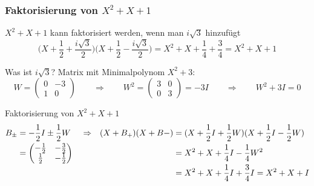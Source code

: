 %
%
%
\begin{frame}[t]
\setlength{\abovedisplayskip}{4pt}
\setlength{\belowdisplayskip}{4pt}
\frametitle{Faktorisierung von $X^2+X+1$}
\vspace{-3pt}
$X^2+X+1$ kann faktorisiert werden, wenn man $i\sqrt{3}$
hinzufügt
\[
\biggl(X+\frac12+\frac{i\sqrt{3}}2\biggr)
\biggl(X+\frac12-\frac{i\sqrt{3}}2\biggr)
=
X^2+X+\frac14
+
\frac34
=
X^2+X+1
\]
\vspace{-10pt}
\begin{block}{Was ist $i\sqrt{3}$?}
Matrix mit Minimalpolynom $X^2+3$:
\[
W=\begin{pmatrix}0&-3\\1&0\end{pmatrix}
\qquad\Rightarrow\qquad
W^2=\begin{pmatrix}3&0\\0&3\end{pmatrix} = -3I
\qquad\Rightarrow\qquad
W^2+3I=0
\]
\end{block}
\vspace{-10pt}
\begin{block}{Faktorisierung von $X^2+X+1$}
\vspace{-10pt}
\begin{align*}
B_\pm
&=
-\frac12I\pm\frac12W
&
&\Rightarrow
&
(X+B_+)(X+B-)
&=
(X+\frac12I+\frac12W)
(X+\frac12I-\frac12W)
\\
&=
\smash{
{\textstyle\begin{pmatrix}-\frac12&-\frac32\\\frac12&-\frac12\end{pmatrix}}
}
&
&
&
&=
X^2+X + \frac14I - \frac14W^2
\\
&
&
&%
&
&=
X^2+X + \frac14I + \frac34I
=
X^2+X+I
\end{align*}
\end{block}

\end{frame}
